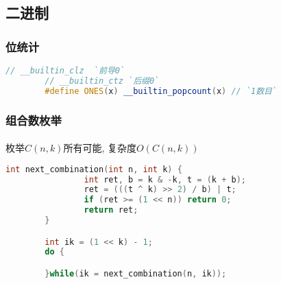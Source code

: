 ﻿\subsection{二进制}
	\subsubsection{位统计}
		\begin{lstlisting}[language=C++]
		// __builtin_clz  `前导0`
		// __builtin_ctz `后缀0`
		#define ONES(x) __builtin_popcount(x) // `1数目`
		\end{lstlisting}
\subsubsection{组合数枚举}
	\paragraph{}
	枚举$C(n, k)$所有可能, 复杂度$O(C(n, k))$
	\begin{lstlisting}[language=C++]
		int next_combination(int n, int k) {
				int ret, b = k & -k, t = (k + b);
				ret = (((t ^ k) >> 2) / b) | t;
				if (ret >= (1 << n)) return 0;
				return ret;
		}

		int ik = (1 << k) - 1;
		do {

		}while(ik = next_combination(n, ik));
	\end{lstlisting}